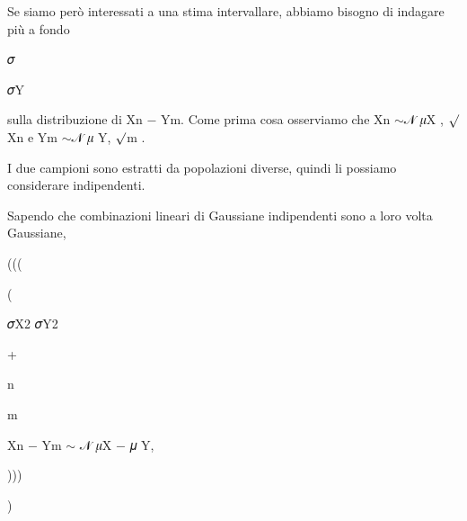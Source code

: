 \documentclass[a4paper,portrait,12pt]{article}
\begin{document}
\begin{flushleft}
Se siamo per\`{o} interessati a una stima intervallare, abbiamo bisogno di indagare più a fondo
\end{flushleft}


\begin{flushleft}
𝜎
\end{flushleft}


\begin{flushleft}
𝜎Y
\end{flushleft}


\begin{flushleft}
sulla distribuzione di Xn $-$ Ym. Come prima cosa osserviamo che Xn $\sim$𝒩 𝜇X , $\surd$Xn e Ym $\sim$𝒩 𝜇 Y, $\surd$m .
\end{flushleft}


\begin{flushleft}
I due campioni sono estratti da popolazioni diverse, quindi li possiamo considerare indipendenti.
\end{flushleft}


\begin{flushleft}
Sapendo che combinazioni lineari di Gaussiane indipendenti sono a loro volta Gaussiane,
\end{flushleft}





(((


(





\begin{flushleft}
𝜎X2 𝜎Y2
\end{flushleft}


+


\begin{flushleft}
n
\end{flushleft}


\begin{flushleft}
m
\end{flushleft}





\begin{flushleft}
Xn $-$ Ym $\sim$ 𝒩 𝜇X $-$ 𝜇 Y,
\end{flushleft}





)))


)
\end{document}

